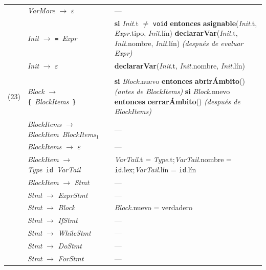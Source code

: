 \documentclass[11pt]{article}
\newcommand{\NT}[1]{\textcolor{ntcolor}{\textit{#1}}}            %
\newcommand{\T}[1]{\textcolor{tcolor}{\texttt{#1}}}              %
\newcommand{\A}[2]{\NT{#1}.\textsf{#2}}                          %
\newcommand{\fn}[1]{\textsf{\textbf{#1}}}                        %
\newcommand{\ty}[1]{\texttt{#1}}                                 %
\newcommand{\kw}[1]{\textbf{#1}}                                 %
\begin{document}
{\begin{longtable}{@{}r@{\hspace{6pt}}>{\raggedright\arraybackslash}p{5.6cm}@{\hspace{8pt}}>{\raggedright\arraybackslash}p{9.9cm}@{}}
\addlinespace[2pt]
{(20)} & \NT{VarMore} $\rightarrow$ $\varepsilon$ & \textcolor{gray}{---} \\
\addlinespace[2pt]
{(21)} & \NT{Init} $\rightarrow$ \T{=}\ \NT{Expr} & \kw{si} \A{Init}{t} $\neq$ \ty{void} \kw{entonces} \fn{asignable}(\A{Init}{t}, \A{Expr}{tipo}, \A{Init}{lín}) \newline \fn{declararVar}(\A{Init}{t}, \A{Init}{nombre}, \A{Init}{lín}) \quad\textit{(después de evaluar \NT{Expr})} \\
\addlinespace[2pt]
{(22)} & \NT{Init} $\rightarrow$ $\varepsilon$ & \fn{declararVar}(\A{Init}{t}, \A{Init}{nombre}, \A{Init}{lín}) \\
\addlinespace[2pt]
\midrule
\multicolumn{3}{l}{\textbf{Sentencias}} \\ \midrule
{(23)} & \NT{Block} $\rightarrow$ \T{\{}\ \NT{BlockItems}\ \T{\}} & \kw{si} \A{Block}{nuevo} \kw{entonces} \fn{abrirÁmbito}() \quad\textit{(antes de \NT{BlockItems})} \newline \kw{si} \A{Block}{nuevo} \kw{entonces} \fn{cerrarÁmbito}() \quad\textit{(después de \NT{BlockItems})} \\
\addlinespace[2pt]
{(24)} & \NT{BlockItems} $\rightarrow$ \NT{BlockItem}\ \NT{BlockItems}$_{1}$ & \textcolor{gray}{---} \\
\addlinespace[2pt]
{(25)} & \NT{BlockItems} $\rightarrow$ $\varepsilon$ & \textcolor{gray}{---} \\
\addlinespace[2pt]
{(26)} & \NT{BlockItem} $\rightarrow$ \NT{Type}\ \T{id}\ \NT{VarTail} & \A{VarTail}{t} = \A{Type}{t};\quad \A{VarTail}{nombre} = \T{id}.\textsf{lex};\quad \A{VarTail}{lín} = \T{id}.\textsf{lín} \\
\addlinespace[2pt]
{(27)} & \NT{BlockItem} $\rightarrow$ \NT{Stmt} & \textcolor{gray}{---} \\
\addlinespace[2pt]
{(28)} & \NT{Stmt} $\rightarrow$ \NT{ExprStmt} & \textcolor{gray}{---} \\
\addlinespace[2pt]
{(29)} & \NT{Stmt} $\rightarrow$ \NT{Block} & \A{Block}{nuevo} = \textsf{verdadero} \\
\addlinespace[2pt]
{(30)} & \NT{Stmt} $\rightarrow$ \NT{IfStmt} & \textcolor{gray}{---} \\
\addlinespace[2pt]
{(31)} & \NT{Stmt} $\rightarrow$ \NT{WhileStmt} & \textcolor{gray}{---} \\
\addlinespace[2pt]
{(32)} & \NT{Stmt} $\rightarrow$ \NT{DoStmt} & \textcolor{gray}{---} \\
\addlinespace[2pt]
{(33)} & \NT{Stmt} $\rightarrow$ \NT{ForStmt} & \textcolor{gray}{---} \\

\end{longtable}}
\end{document}
